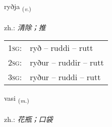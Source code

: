 \documentclass[frontgrid, backgrid]{flacards}\usepackage[]{graphicx}\usepackage[]{xcolor}
\begin{document}
\renewcommand{\flhead}{\vskip5pt \fboxsep=0pt {\small\bfseries\footnotesize Sagnorð | 动词}}
\renewcommand{\fcfoot}{\vskip5pt \fboxsep=0pt \hspace{2pt}{\small\bfseries\footnotesize 3K}}

\renewcommand{\blhead}{\vskip5pt {\small\bfseries\footnotesize Sagnorð | 动词 }}
\renewcommand{\bcfoot}{\vskip5pt \hspace{2pt}{\small\bfseries\footnotesize 3K}}


{ryðja \small{\textsubscript{(\textit{v.})}} \\[1ex] %
\textphonetic{[rɪðja]} \\
zh.: \emph{清除；推} \\  [2ex]
\renewcommand*{\arraystretch}{0.8}
\begin{tabular}{p{1cm}l}
\textsc{1sg}: & ryð -- ruddi -- rutt \\ 
\textsc{2sg}: & ryður -- ruddir -- rutt \\ 
\textsc{3sg}: & ryður -- ruddi -- rutt \\ 
\end{tabular}
}

\renewcommand{\flhead}{\vskip5pt \fboxsep=0pt {\small\bfseries\footnotesize Nafnorð | 名词}}
\renewcommand{\fcfoot}{\vskip5pt \fboxsep=0pt \hspace{2pt}{\small\bfseries\footnotesize 3K}}

\renewcommand{\blhead}{\vskip5pt {\small\bfseries\footnotesize Nafnorð | 名词 }}
\renewcommand{\bcfoot}{\vskip5pt \hspace{2pt}{\small\bfseries\footnotesize 3K}}


{vasi \small{\textsubscript{(\textit{m.})}} \\[1ex] %
\textphonetic{[vaːsɪ]} \\
zh.: \emph{花瓶；口袋} \\  [2ex]
\renewcommand*{\arraystretch}{0.8}
}
\end{document}

